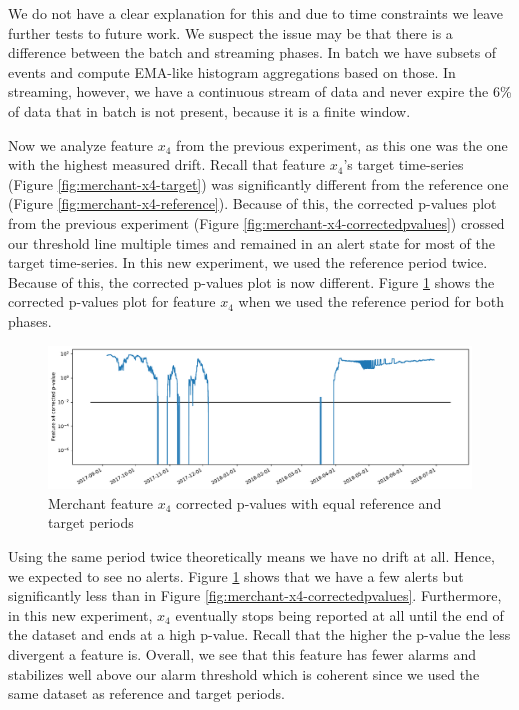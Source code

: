 \documentclass[sigconf]{acmart}
\begin{document}
We do not have a clear explanation for this and due to time constraints we leave further tests to future work. We suspect the issue may be that there is a difference between the batch and streaming phases. In batch we have subsets of events and compute EMA-like histogram aggregations based on those. In streaming, however, we have a continuous stream of data and never expire the 6\% of data that in batch is not present, because it is a finite window.

Now we analyze feature $x_4$ from the previous experiment, as this one was the one with the highest measured drift. Recall that feature $x_4$'s target time-series (Figure \ref{fig:merchant-x4-target}) was significantly different from the reference one (Figure \ref{fig:merchant-x4-reference}). Because of this, the corrected p-values plot from the previous experiment (Figure \ref{fig:merchant-x4-correctedpvalues}) crossed our threshold line multiple times and remained in an alert state for most of the target time-series. In this new experiment, we used the reference period twice. Because of this, the corrected p-values plot is now different. Figure \ref{fig:merchant2-x4-correctedpvalues} shows the corrected p-values plot for feature $x_4$ when we used the reference period for both phases.
\begin{figure}[!htb]
    \begin{center}
      \includegraphics[scale=0.25]{figures/merchant2-x4-correctedpvalues.pdf}
      \caption{Merchant feature $x_4$ corrected p-values with equal reference and target periods}
      \label{fig:merchant2-x4-correctedpvalues}
    \end{center}
\end{figure}
Using the same period twice theoretically means we have no drift at all. Hence, we expected to see no alerts. Figure \ref{fig:merchant2-x4-correctedpvalues} shows that we have a few alerts but significantly less than in Figure \ref{fig:merchant-x4-correctedpvalues}. Furthermore, in this new experiment, $x_4$ eventually stops being reported at all until the end of the dataset and ends at a high p-value. Recall that the higher the p-value the less divergent a feature is. Overall, we see that this feature has fewer alarms and stabilizes well above our alarm threshold which is coherent since we used the same dataset as reference and target periods.
\end{document}
